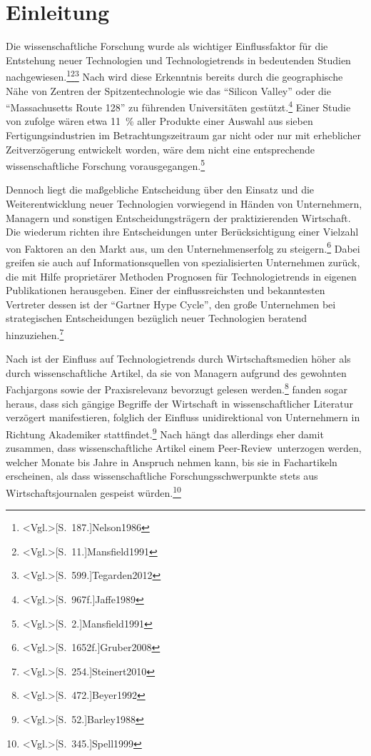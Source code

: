 \section{Einleitung}
Die wissenschaftliche Forschung wurde als wichtiger Einflussfaktor für die Entstehung neuer Technologien und Technologietrends in bedeutenden Studien nachgewiesen.\footnote{\citeNP<Vgl.>[S.~187.]{Nelson1986}}\footnote{\citeNP<Vgl.>[S.~11.]{Mansfield1991}}\footnote{\citeNP<Vgl.>[S.~599.]{Tegarden2012}}
Nach  wird diese Erkenntnis bereits durch die geographische Nähe von Zentren der Spitzentechnologie wie das "`Silicon Valley"' oder die "`Massachusetts Route 128"' zu führenden Universitäten gestützt.\footnote{\citeNP<Vgl.>[S.~967f.]{Jaffe1989}} Einer Studie von  zufolge wären etwa 11~\% aller Produkte einer Auswahl aus sieben Fertigungsindustrien im Betrachtungszeitraum gar nicht oder nur mit erheblicher Zeitverzögerung entwickelt worden, wäre dem nicht eine entsprechende wissenschaftliche Forschung vorausgegangen.\footnote{\citeNP<Vgl.>[S.~2.]{Mansfield1991}}

Dennoch liegt die maßgebliche Entscheidung über den Einsatz und die Weiterentwicklung neuer Technologien vorwiegend in Händen von Unternehmern, Managern und sonstigen Entscheidungsträgern der praktizierenden Wirtschaft. Die wiederum richten ihre Entscheidungen unter Berücksichtigung einer Vielzahl von Faktoren an den Markt aus, um den Unternehmenserfolg zu steigern.\footnote{\citeNP<Vgl.>[S.~1652f.]{Gruber2008}} Dabei greifen sie auch auf Informationsquellen von spezialisierten Unternehmen zurück, die mit Hilfe proprietärer Methoden Prognosen für Technologietrends in eigenen Publikationen herausgeben. Einer der einflussreichsten und bekanntesten Vertreter dessen ist der "`Gartner Hype Cycle"', den große Unternehmen bei strategischen Entscheidungen bezüglich neuer Technologien beratend hinzuziehen.\footnote{\citeNP<Vgl.>[S.~254.]{Steinert2010}}

Nach  ist der Einfluss auf Technologietrends durch Wirtschaftsmedien höher als durch wissenschaftliche Artikel, da sie von Managern aufgrund des gewohnten Fachjargons sowie der Praxisrelevanz bevorzugt gelesen werden.\footnote{\citeNP<Vgl.>[S.~472.]{Beyer1992}}  fanden sogar heraus, dass sich gängige Begriffe der Wirtschaft in wissenschaftlicher Literatur verzögert manifestieren, folglich der Einfluss unidirektional von Unternehmern in Richtung Akademiker stattfindet.\footnote{\citeNP<Vgl.>[S.~52.]{Barley1988}} Nach  hängt das allerdings eher damit zusammen, dass wissenschaftliche Artikel einem \glqq Peer-Review\grqq~unterzogen werden, welcher Monate bis Jahre in Anspruch nehmen kann, bis sie in Fachartikeln erscheinen, als dass wissenschaftliche Forschungsschwerpunkte stets aus Wirtschaftsjournalen gespeist würden.\footnote{\citeNP<Vgl.>[S.~345.]{Spell1999}}

